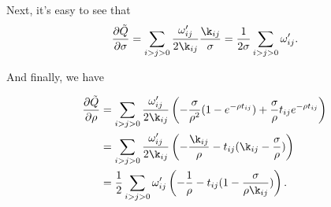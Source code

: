 \documentclass[12pt,leqno]{article}
\begin{document}
Next, it's easy to see that
\begin{equation}\label{dQ_dsigma}
\frac{\partial\tilde{Q}}{\partial\sigma} = \sum_{i>j>0}\frac{\omega'_{ij}}{2\k_{ij}}\frac{\k_{ij}}{\sigma} 
= \frac{1}{2\sigma}\sum_{i>j>0}\omega'_{ij}.
\end{equation}

And finally, we have

\begin{equation}\label{dQ_drho}
\begin{split}
\frac{\partial\tilde{Q}}{\partial\rho} &= \sum_{i>j>0}\frac{\omega'_{ij}}{2\k_{ij}}\left(-\frac{\sigma}{\rho^2}(1-e^{-\rho{t_{ij}}})
+\frac{\sigma}{\rho}t_{ij}e^{-\rho{t_{ij}}}\right) \\
&= \sum_{i>j>0}\frac{\omega'_{ij}}{2\k_{ij}}\left(-\frac{\k_{ij}}{\rho} -t_{ij}(\k_{ij} - \frac{\sigma}{\rho})\right)\\
&= \frac{1}{2}\sum_{i>j>0}\omega'_{ij}\left(-\frac{1}{\rho} -t_{ij}(1 - \frac{\sigma}{\rho\k_{ij}})\right).
\end{split}
\end{equation}
    
\end{document}
